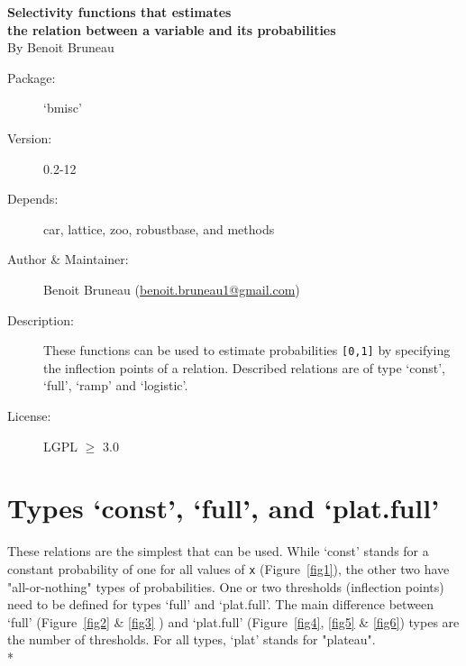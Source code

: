 \documentclass[letterpaper, 12pt]{article}
\begin{document}
\begin{titlepage}
\vspace*{3cm}
\begin{center}

\huge{\bf Selectivity functions that estimates\\ the relation between a variable and its probabilities}\\

\vspace*{2cm}
\large{By Benoit Bruneau}
\end{center}
\vspace*{4cm}

\begin{description}
\item[Package:] `bmisc'
\item[Version:] 0.2-12
\item[Depends:] car, lattice, zoo, robustbase, and methods
\item[Author \& Maintainer:] Benoit Bruneau (\href{mailto:benoit.bruneau1@gmail.com}{benoit.bruneau1@gmail.com})
\item[Description:] These functions can be used to estimate probabilities \verb=[0,1]= by specifying the inflection points of a relation. Described relations are of type `const', `full', `ramp' and `logistic'.
\item[License:] LGPL $\geqslant$ 3.0
\end{description}


\vspace*{\fill}


\end{titlepage}

\tableofcontents
\newpage

\section{Types `const', `full', and `plat.full'}
\noindent These relations are the simplest that can be used. While `const' stands for a constant probability of one for all 
values of \verb#x# (Figure~\ref{fig1}), the other two have "all-or-nothing" types of probabilities. One or two thresholds 
(inflection points) need to be defined for types `full' and `plat.full'. The main difference between `full'
(Figure~\ref{fig2} \& \ref{fig3} ) 
and `plat.full' (Figure~\ref{fig4}, \ref{fig5} \& \ref{fig6}) types are the number of thresholds. For all types, `plat' stands for "plateau".\\*
\end{document}
